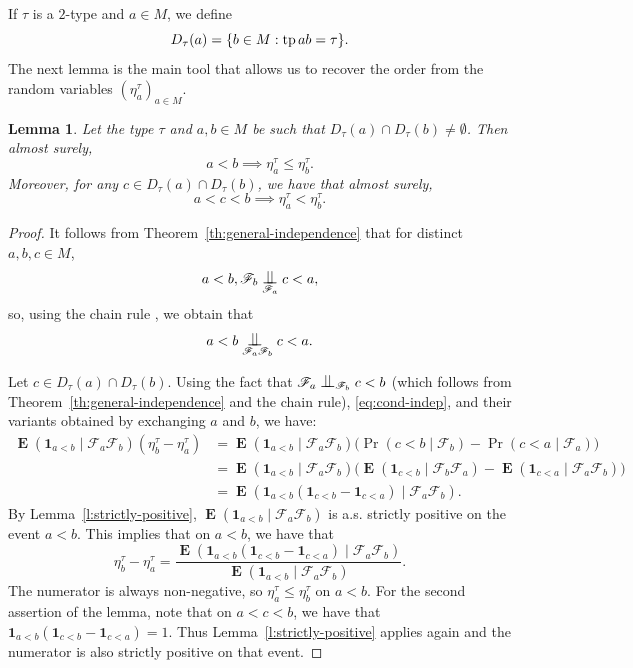 \documentclass[11pt]{article}
\let\mathcal\mathscr
\theoremstyle{plain}
\newtheorem{lemma}[theorem]{Lemma}
\theoremstyle{definition}
\newcommand{\bOne}{{\mathbf 1}}
\newcommand{\cF}{\mathcal{F}}
\DeclareMathOperator{\E}{\mathbf{E}}
\DeclareMathOperator{\tp}{tp}
\DeclarePairedDelimiter\set{\{}{\}}
\newcommand{\indep}[1][]{%
  \mathrel{
    \mathop{
      \scalebox{1}[1.3]{\text{$\perp\!\!\!\perp$}}
    }\displaylimits_{#1}
  }
}
\begin{document}
If $\tau$ is a $2$-type and $a \in M$, we define
\begin{equation*}
D_\tau(a) = \set{b \in M : \tp ab = \tau}.
\end{equation*}
The next lemma is the main tool that allows us to recover the order from the random variables $(\eta^\tau_a)_{a \in M}$.
\begin{lemma}
\label{Lem:Inters}
Let the type $\tau$ and $a, b \in M$ be such that $D_\tau(a) \cap D_\tau(b) \neq \emptyset$. Then almost surely,
\begin{equation*}
a<b \implies \eta_a^\tau \leq \eta_b^\tau.
\end{equation*}
Moreover, for any $c \in D_\tau(a) \cap D_\tau(b)$, we have that almost surely,
\begin{equation*}
a < c < b \implies \eta^\tau_a < \eta^\tau_b.
\end{equation*}
\end{lemma}
\begin{proof}
It follows from Theorem~\ref{th:general-independence} that for distinct $a, b, c \in M$,
\begin{equation*}
a < b, \cF_b \indep[\cF_a] c < a,
\end{equation*}
so, using the chain rule \cite[Prop.\,5.8]{Kallenberg2002}, we obtain that
\begin{equation}
\label{eq:cond-indep}
a < b \indep[\cF_a \cF_b] c < a.
\end{equation}

Let $c \in D_\tau(a) \cap D_\tau(b)$. Using the fact that $\cF_a \indep[\cF_b] c < b$ (which follows from Theorem~\ref{th:general-independence} and the chain rule), \eqref{eq:cond-indep}, and their variants obtained by exchanging $a$ and $b$, we have:
\begin{equation*}
\begin{split}
\E(\bOne_{a < b} \mid \cF_a \cF_b) ( \eta^\tau_b - \eta^\tau_a ) &= \E(\bOne_{a < b} \mid \cF_a \cF_b) \big(\Pr(c < b \mid \cF_b) - \Pr(c < a \mid \cF_a) \big) \\
&= \E(\bOne_{a < b} \mid \cF_a \cF_b) \big(\E(\bOne_{c < b} \mid \cF_b \cF_a) - \E(\bOne_{c < a} \mid \cF_a \cF_b) \big) \\
&= \E(\bOne_{a < b}(\bOne_{c < b} - \bOne_{c < a}) \mid \cF_a \cF_b ).
\end{split}
\end{equation*}
By Lemma~\ref{l:strictly-positive}, $\E(\bOne_{a < b} \mid \cF_a \cF_b)$ is a.s. strictly positive on the event $a < b$. This implies that on $a < b$, we have that
\begin{equation*}
\eta^\tau_b - \eta^\tau_a = \frac{\E(\bOne_{a < b}(\bOne_{c < b} - \bOne_{c < a}) \mid \cF_a \cF_b )}{\E(\bOne_{a < b} \mid \cF_a \cF_b)}.
\end{equation*}
The numerator is always non-negative, so $\eta^\tau_a \leq \eta^\tau_b$ on $a < b$. For the second assertion of the lemma, note that on $a < c < b$, we have that $\bOne_{a < b}(\bOne_{c < b} - \bOne_{c < a}) = 1$. Thus Lemma~\ref{l:strictly-positive} applies again and the numerator is also strictly positive on that event.
\end{proof}
\end{document}
